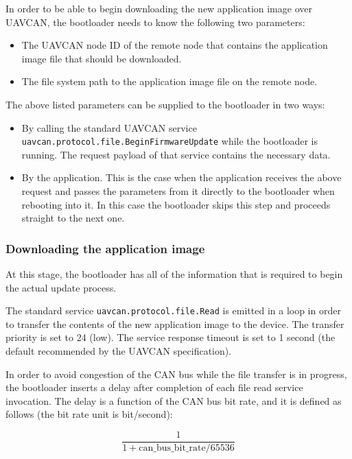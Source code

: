 \documentclass{zubaxdoc}
\begin{document}
In order to be able to begin downloading the new application image over UAVCAN,
the bootloader needs to know the following two parameters:
\begin{itemize}
    \item The UAVCAN node ID of the remote node that contains the application image file
          that should be downloaded.

    \item The file system path to the application image file on the remote node.
\end{itemize}

The above listed parameters can be supplied to the bootloader in two ways:
\begin{itemize}
    \item By calling the standard UAVCAN service \verb|uavcan.protocol.file.BeginFirmwareUpdate|
          while the bootloader is running.
          The request payload of that service contains the necessary data.
          
    \item By the application. This is the case when the application receives the above request
          and passes the parameters from it directly to the bootloader when rebooting into it.
          In this case the bootloader skips this step and proceeds straight to the next one.
\end{itemize}

\subsubsection{Downloading the application image}\label{sec:bootloader_uavcan_file_transfer}

At this stage, the bootloader has all of the information that is required to begin the actual update process.

The standard service \verb|uavcan.protocol.file.Read| is emitted in a loop in order to transfer
the contents of the new application image to the device.
The transfer priority is set to 24 (low).
The service response timeout is set to 1 second (the default recommended by the UAVCAN specification).

In order to avoid congestion of the CAN bus while the file transfer is in progress,
the bootloader inserts a delay after completion of each file read service invocation.
The delay is a function of the CAN bus bit rate, and it is defined as follows
(the bit rate unit is bit/second):

$$\frac{1}{1 + {\text{can{\_}bus{\_}bit{\_}rate}}/{65536}}$$
\end{document}
